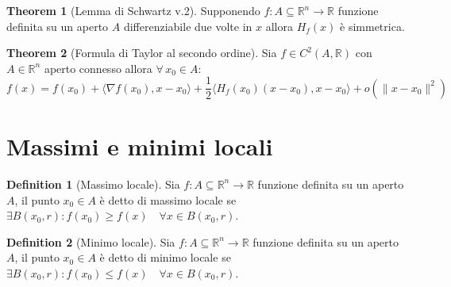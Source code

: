 \documentclass[leqno]{article}
\theoremstyle{definition}
\newtheorem{definition}{Definition}[section]
\numberwithin{equation}{section}
\newtheorem{theorem}{Theorem}[section]
\theoremstyle{remark}
\begin{document}
	\begin{theorem}[Lemma di Schwartz v.2]
		Supponendo $f:A\subseteq \mathbb{R}^n \rightarrow \mathbb{R}$ funzione definita su un aperto $A$ differenziabile due volte in $x$ allora $H_f(x)$ è simmetrica.
	\end{theorem}
	
	\begin{theorem}[Formula di Taylor al secondo ordine]
		Sia $f\in C^2(A,\mathbb{R})$ con $A\in \mathbb{R}^n$ aperto connesso allora $\forall \, x_0 \in A$:
		\begin{equation}
			f(x)=f(x_0)+\langle \nabla f(x_0), x-x_0\rangle + \frac{1}{2}\langle H_f(x_0)(x-x_0),x-x_0 \rangle + o(\lVert x-x_0 \rVert ^2)
		\end{equation}
	\end{theorem}
	
	\section{Massimi e minimi locali}
	
	\begin{definition}[Massimo locale]
		Sia $f:A\subseteq \mathbb{R}^n \rightarrow \mathbb{R}$ funzione definita su un aperto $A$, il punto $x_0 \in A$ è detto di massimo locale se $\exists B(x_0,r) : f(x_0)\ge f(x) \quad \forall x \in B(x_0,r)$.
	\end{definition}
	
	\begin{definition}[Minimo locale]
		Sia $f:A\subseteq \mathbb{R}^n \rightarrow \mathbb{R}$ funzione definita su un aperto $A$, il punto $x_0 \in A$ è detto di minimo locale se $\exists B(x_0,r) : f(x_0)\le f(x) \quad \forall x \in B(x_0,r)$.
	\end{definition}
	
\end{document}
